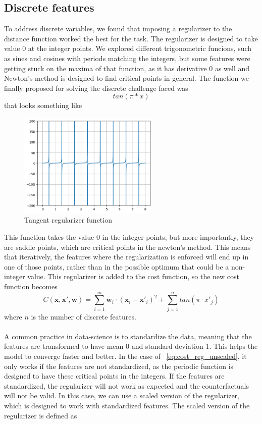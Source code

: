\documentclass[12pt]{extarticle}
\numberwithin{equation}{section}
\begin{document}
\subsection{Discrete features}
To address discrete variables, we found that imposing a regularizer to the distance function worked the best for the task. The regularizer is designed 
to take value 0 at the integer points. We explored different trigonometric funcions, such as sines and cosines with periods matching the integers, but some features were getting stuck on the maxima of that function, as it has derivative 0 as well and Newton's method is designed to find critical points in general. The function we finally proposed for solving the discrete challenge faced was
\begin{equation}
    tan(\pi * x)
\end{equation}
that looks something like
\begin{figure}[H]
    \centering
    \includegraphics[width=0.6\textwidth]{images/integers}
    \caption{Tangent regularizer function}
    \label{fig:reg tan}
\end{figure}
This function takes the value 0 in the integer points, but more importantly, they are saddle points, which are critical points in the newton's method. This means that iteratively, the features where the regularization is enforced will end up in one of those points, rather than in the possible optimum that could be a non-integer value. This regularizer is added to the cost function, so the new cost function becomes
\begin{equation}\label{eq:cost_reg_unscaled}
    C(\mathbf{x}, \mathbf{x}', \mathbf{w}) = \sum_{i=1}^{m} \mathbf{w}_i \cdot (\mathbf{x}_i - \mathbf{x}'_{i})^2 + \sum_{j=1}^{n} tan(\pi \cdot x'_j)
\end{equation}
where \(n\) is the number of discrete features. \\
\\
A common practice in data-science is to standardize the data, meaning that the features are transformed to have mean 0 and standard deviation 1. This helps the model to converge faster and better. In the case of ~\eqref{eq:cost_reg_unscaled}, it only works if the features are not standardized, as the periodic function is designed to have these critical points in the integers. If the features are standardized, the regularizer will not work as expected and the counterfactuals will not be valid. In this case, we can use a scaled version of the regularizer, which is designed to work with standardized features. The scaled version of the regularizer is defined as
\end{document}
